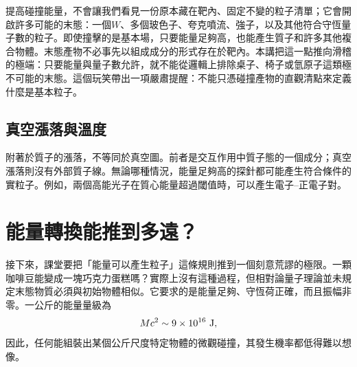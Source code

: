 提高碰撞能量，不會讓我們看見一份原本藏在靶內、固定不變的粒子清單；它會開啟許多可能的末態：一個\(W\)、多個玻色子、夸克噴流、強子，以及其他符合守恆量子數的粒子。即使撞擊的是基本場，只要能量足夠高，也能產生質子和許多其他複合物體。末態產物不必事先以組成成分的形式存在於靶內。本講把這一點推向滑稽的極端：只要能量與量子數允許，就不能從邏輯上排除桌子、椅子或氫原子這類極不可能的末態。這個玩笑帶出一項嚴肅提醒：不能只憑碰撞產物的直觀清點來定義什麼是基本粒子。

\subsection{真空漲落與溫度}

附著於質子的漲落，不等同於真空圖。前者是交互作用中質子態的一個成分；真空漲落則沒有外部質子線。無論哪種情況，能量足夠高的探針都可能產生符合條件的實粒子。例如，兩個高能光子在質心能量超過閾值時，可以產生電子--正電子對。

\begin{classroomqa}
\end{classroomqa}

\begin{classroomqa}
\end{classroomqa}

\begin{classroomqa}
\end{classroomqa}

\section{能量轉換能推到多遠？}

接下來，課堂要把「能量可以產生粒子」這條規則推到一個刻意荒謬的極限。一顆咖啡豆能變成一塊巧克力蛋糕嗎？實際上沒有這種過程，但相對論量子理論並未規定末態物質必須與初始物體相似。它要求的是能量足夠、守恆荷正確，而且振幅非零。一公斤的能量量級為
\begin{equation}
  Mc^2\sim9\times10^{16}\ {\rm J},
\end{equation}
因此，任何能組裝出某個公斤尺度特定物體的微觀碰撞，其發生機率都低得難以想像。

